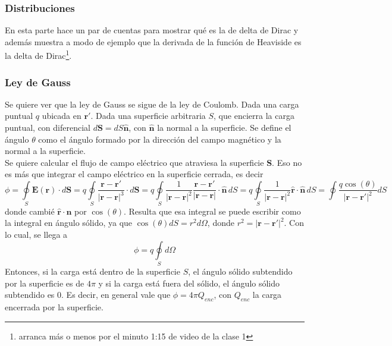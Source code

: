\subsubsection{Distribuciones}
En esta parte hace un par de cuentas para mostrar qué es la de delta de Dirac y además muestra a modo de ejemplo que la derivada de la función de Heaviside es la delta de Dirac\footnote{arranca más o menos por el minuto 1:15 de video de la clase 1}.




\subsubsection{Ley de Gauss}
Se quiere ver que la ley de Gauss se sigue de la ley de Coulomb. Dada una carga puntual $q$ ubicada en $\textbf{r}'$. Dada una superficie arbitraria $S$, que encierra la carga puntual, con diferencial $d\textbf{S} = dS\hat{\textbf{n}}$, con $\hat{\textbf{n}}$ la normal a la superficie. Se define el ángulo $\theta$ como el ángulo formado por la dirección del campo magnético y la normal a la superficie.\\
\indent Se quiere calcular el flujo de campo eléctrico que atraviesa la superficie \textbf{S}. Eso no es más que integrar el campo eléctrico en la superficie cerrada, es decir
\begin{equation*}
    \phi 
    = \oint\limits_{S} \textbf{E}(\textbf{r})\cdot d\textbf{S}
    = q\oint\limits_{S}
    \frac{\textbf{r}-\textbf{r}'}{|\textbf{r}-\textbf{r}|^{3}}\cdot d\textbf{S}
    = q\oint\limits_{S}
    \frac{1}{|\textbf{r}-\textbf{r}|^{2}}
    \frac{\textbf{r}-\textbf{r}'}{|\textbf{r}-\textbf{r}|} \cdot \hat{\textbf{n}}\,dS
    = q\oint\limits_{S}
    \frac{1}{|\textbf{r}-\textbf{r}|^{2}}
    \hat{\textbf{r}} \cdot \hat{\textbf{n}}\,dS
    = \oint \frac{q\cos{(\theta)}}{|\textbf{r}-\textbf{r}'|^{2}}dS
\end{equation*}
donde cambié $\hat{\textbf{r}}\cdot \textbf{n}$ por $\cos{(\theta)}$. Resulta que esa integral se puede escribir como la integral en ángulo sólido, ya que $\cos{(\theta)}dS = r^{2}d\Omega$, donde $r^{2} = |\textbf{r}-\textbf{r}'|^{2}$. Con lo cual, se llega a
\begin{equation*}
    \phi = q\oint\limits_{S}d\Omega
\end{equation*}
Entonces, si la carga está dentro de la superficie $S$, el ángulo sólido subtendido por la superficie es de $4\pi$ y si la carga está fuera del sólido, el ángulo sólido subtendido es 0. Es decir, en general vale que $\phi = 4\pi Q_{enc}$, con $Q_{enc}$ la carga encerrada por la superficie.\\
